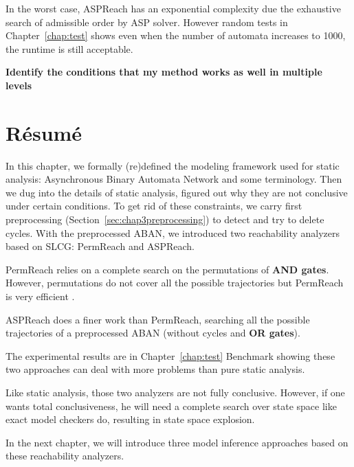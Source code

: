 In the worst case, ASPReach has an exponential complexity due the exhaustive search of admissible order by ASP solver.
However random tests in Chapter~\ref{chap:test} shows even when the number of automata increases to 1000, the runtime is still acceptable.

\textbf{Identify the conditions that my method works as well in multiple levels}

\section{R\'esum\'e}
In this chapter, we formally (re)defined the modeling framework used for static analysis: Asynchronous Binary Automata Network and some terminology.
Then we dug into the details of static analysis, figured out why they are not conclusive under certain conditions.
To get rid of these constraints, we carry first preprocessing (Section~\ref{sec:chap3preprocessing}) to detect and try to delete cycles.
With the preprocessed ABAN, we introduced two reachability analyzers based on SLCG: PermReach and ASPReach.

PermReach relies on a complete search on the permutations of \textbf{AND gates}.
However, permutations do not cover all the possible trajectories but PermReach is very efficient .

ASPReach does a finer work than PermReach, searching all the possible trajectories of a preprocessed ABAN (without cycles and \textbf{OR gates}).

The experimental results are in Chapter~\ref{chap:test} Benchmark showing these two approaches can deal with more problems than pure static analysis.

Like static analysis, those two analyzers are not fully conclusive.
However, if one wants total conclusiveness, he will need a complete search over state space like exact model checkers do, resulting in state space explosion.

In the next chapter, we will introduce three model inference approaches based on these reachability analyzers.